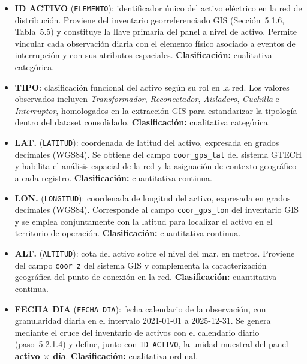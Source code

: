 \begin{itemize}
    \item \textbf{ID ACTIVO} (\texttt{ELEMENTO}): identificador único del activo eléctrico en la red de distribución. Proviene del inventario georreferenciado GIS (Sección~5.1.6, Tabla~5.5) y constituye la llave primaria del panel a nivel de activo. Permite vincular cada observación diaria con el elemento físico asociado a eventos de interrupción y con sus atributos espaciales. \textbf{Clasificación:} cualitativa categórica.

    \item \textbf{TIPO}: clasificación funcional del activo según su rol en la red. Los valores observados incluyen \emph{Transformador}, \emph{Reconectador}, \emph{Aisladero}, \emph{Cuchilla} e \emph{Interruptor}, homologados en la extracción GIS para estandarizar la tipología dentro del dataset consolidado. \textbf{Clasificación:} cualitativa categórica.

    \item \textbf{LAT.} (\texttt{LATITUD}): coordenada de latitud del activo, expresada en grados decimales (WGS84). Se obtiene del campo \texttt{coor\_gps\_lat} del sistema GTECH y habilita el análisis espacial de la red y la asignación de contexto geográfico a cada registro. \textbf{Clasificación:} cuantitativa continua.

    \item \textbf{LON.} (\texttt{LONGITUD}): coordenada de longitud del activo, expresada en grados decimales (WGS84). Corresponde al campo \texttt{coor\_gps\_lon} del inventario GIS y se emplea conjuntamente con la latitud para localizar el activo en el territorio de operación. \textbf{Clasificación:} cuantitativa continua.

    \item \textbf{ALT.} (\texttt{ALTITUD}): cota del activo sobre el nivel del mar, en metros. Proviene del campo \texttt{coor\_z} del sistema GIS y complementa la caracterización geográfica del punto de conexión en la red. \textbf{Clasificación:} cuantitativa continua.

    \item \textbf{FECHA DIA} (\texttt{FECHA\_DIA}): fecha calendario de la observación, con granularidad diaria en el intervalo 2021-01-01 a 2025-12-31. Se genera mediante el cruce del inventario de activos con el calendario diario (paso~5.2.1.4) y define, junto con \texttt{ID ACTIVO}, la unidad muestral del panel \textbf{activo $\times$ día}. \textbf{Clasificación:} cualitativa ordinal.
\end{itemize}

